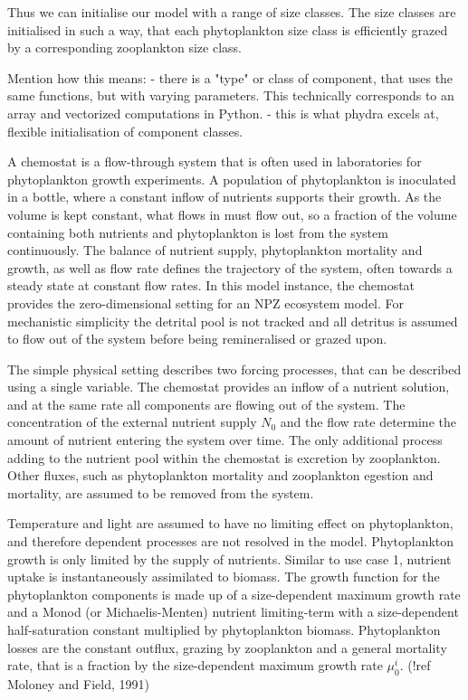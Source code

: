\documentclass[journal abbreviations, manuscript]{copernicus}
\begin{document}
Thus we can initialise our model with a range of size classes. The size classes are initialised in such a way, that each phytoplankton size class is efficiently grazed by a corresponding zooplankton size class.

Mention how this means:
- there is a "type" or class of component, that uses the same functions, but with varying parameters. This technically corresponds to an array and vectorized computations in Python.
- this is what phydra excels at, flexible initialisation of component classes.

A chemostat is a flow-through system that is often used in laboratories for phytoplankton growth experiments. A population of phytoplankton is inoculated in a bottle, where a constant inflow of nutrients supports their growth. As the volume is kept constant, what flows in must flow out, so a fraction of the volume containing both nutrients and phytoplankton is lost from the system continuously. The balance of nutrient supply, phytoplankton mortality and growth, as well as flow rate defines the trajectory of the system, often towards a steady state at constant flow rates. 
In this model instance, the chemostat provides the zero-dimensional setting for an NPZ ecosystem model. For mechanistic simplicity the detrital pool is not tracked and all detritus is assumed to flow out of the system before being remineralised or grazed upon.

The simple physical setting describes two forcing processes, that can be described using a single variable. The chemostat provides an inflow of a nutrient solution, and at the same rate all components are flowing out of the system. The concentration of the external nutrient supply $N_0$ and the flow rate determine the amount of nutrient entering the system over time. The only additional process adding to the nutrient pool within the chemostat is excretion by zooplankton. Other fluxes, such as phytoplankton mortality and zooplankton egestion and mortality, are assumed to be removed from the system.

Temperature and light are assumed to have no limiting effect on phytoplankton, and therefore dependent processes are not resolved in the model. Phytoplankton growth is only limited by the supply of nutrients. Similar to use case 1, nutrient uptake is instantaneously assimilated to biomass. The growth function for the phytoplankton components is made up of a size-dependent maximum growth rate and a Monod (or Michaelis-Menten) nutrient limiting-term with a size-dependent half-saturation constant multiplied by phytoplankton biomass. 
Phytoplankton losses are the constant outflux, grazing by zooplankton and a general mortality rate, that is a fraction by the size-dependent maximum growth rate $\mu^i_0$. (!ref Moloney and Field, 1991)
\end{document}
